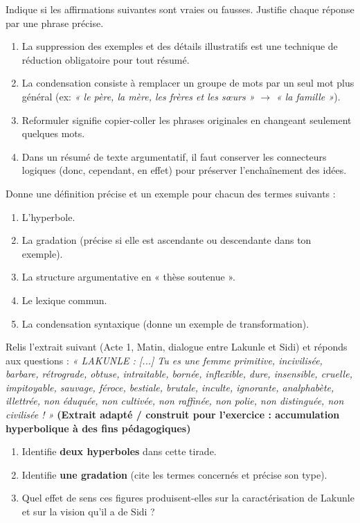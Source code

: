 \documentclass[11pt]{article}
\begin{document}
\begin{exercice}
Indique si les affirmations suivantes sont vraies ou fausses. Justifie chaque réponse par une phrase précise.
\begin{enumerate}
    \item La suppression des exemples et des détails illustratifs est une technique de réduction obligatoire pour tout résumé.
    \item La condensation consiste à remplacer un groupe de mots par un seul mot plus général (ex: \emph{« le père, la mère, les frères et les sœurs »} $\rightarrow$ \emph{« la famille »}).
    \item Reformuler signifie copier-coller les phrases originales en changeant seulement quelques mots.
    \item Dans un résumé de texte argumentatif, il faut conserver les connecteurs logiques (donc, cependant, en effet) pour préserver l'enchaînement des idées.
\end{enumerate}
\end{exercice}

\begin{exercice}
Donne une définition précise et un exemple pour chacun des termes suivants :
\begin{enumerate}
    \item L'hyperbole.
    \item La gradation (précise si elle est ascendante ou descendante dans ton exemple).
    \item La structure argumentative en « thèse soutenue ».
    \item Le lexique commun.
    \item La condensation syntaxique (donne un exemple de transformation).
\end{enumerate}
\end{exercice}

\begin{exercice}
Relis l'extrait suivant (Acte 1, Matin, dialogue entre Lakunle et Sidi) et réponds aux questions :
\emph{« LAKUNLE : [...] Tu es une femme primitive, incivilisée, barbare, rétrograde, obtuse, intraitable, bornée, inflexible, dure, insensible, cruelle, impitoyable, sauvage, féroce, bestiale, brutale, inculte, ignorante, analphabète, illettrée, non éduquée, non cultivée, non raffinée, non polie, non distinguée, non civilisée ! »} \textbf{(Extrait adapté / construit pour l'exercice : accumulation hyperbolique à des fins pédagogiques)}
\begin{enumerate}
    \item Identifie \textbf{deux hyperboles} dans cette tirade.
    \item Identifie \textbf{une gradation} (cite les termes concernés et précise son type).
    \item Quel effet de sens ces figures produisent-elles sur la caractérisation de Lakunle et sur la vision qu'il a de Sidi ?
\end{enumerate}
\end{exercice}
\end{document}
